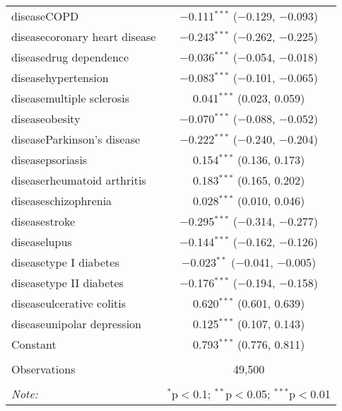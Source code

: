 \begin{table}[!htbp]
\begin{tabular}{@{\extracolsep{5pt}}lc}
  diseaseCOPD & $-$0.111$^{***}$ ($-$0.129, $-$0.093) \\ 
  diseasecoronary heart disease & $-$0.243$^{***}$ ($-$0.262, $-$0.225) \\ 
  diseasedrug dependence & $-$0.036$^{***}$ ($-$0.054, $-$0.018) \\ 
  diseasehypertension & $-$0.083$^{***}$ ($-$0.101, $-$0.065) \\ 
  diseasemultiple sclerosis & 0.041$^{***}$ (0.023, 0.059) \\ 
  diseaseobesity & $-$0.070$^{***}$ ($-$0.088, $-$0.052) \\ 
  diseaseParkinson's disease & $-$0.222$^{***}$ ($-$0.240, $-$0.204) \\ 
  diseasepsoriasis & 0.154$^{***}$ (0.136, 0.173) \\ 
  diseaserheumatoid arthritis & 0.183$^{***}$ (0.165, 0.202) \\ 
  diseaseschizophrenia & 0.028$^{***}$ (0.010, 0.046) \\ 
  diseasestroke & $-$0.295$^{***}$ ($-$0.314, $-$0.277) \\ 
  diseaselupus & $-$0.144$^{***}$ ($-$0.162, $-$0.126) \\ 
  diseasetype I diabetes & $-$0.023$^{**}$ ($-$0.041, $-$0.005) \\ 
  diseasetype II diabetes & $-$0.176$^{***}$ ($-$0.194, $-$0.158) \\ 
  diseaseulcerative colitis & 0.620$^{***}$ (0.601, 0.639) \\ 
  diseaseunipolar depression & 0.125$^{***}$ (0.107, 0.143) \\ 
  Constant & 0.793$^{***}$ (0.776, 0.811) \\ 
 \hline \\[-1.8ex] 
Observations & 49,500 \\ 
\hline 
\hline \\[-1.8ex] 
\textit{Note:}  & \multicolumn{1}{r}{$^{*}$p$<$0.1; $^{**}$p$<$0.05; $^{***}$p$<$0.01} \\ 
\end{tabular} 
\end{table} 
